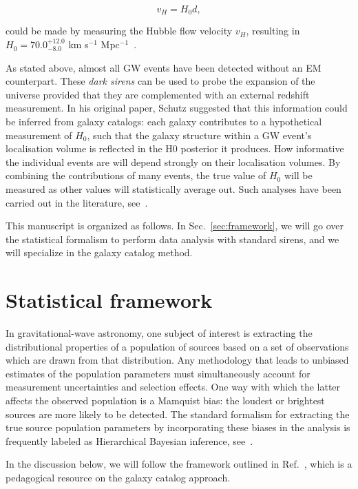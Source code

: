 \documentclass[%
preprint,
 amsmath,amssymb,
 aps,
]{revtex4-2}
\begin{document}
\begin{equation}
	v_H = H_0 d,
\end{equation}

could be made by measuring the Hubble flow velocity $v_H$, resulting in $H_0 = 70.0^{+12.0}_{-8.0}$
km s$^{-1}$ Mpc$^{-1}$~\cite{LIGOScientific:2017adf}.

As stated above, almost all GW events have been detected without an EM counterpart. These
\textit{dark sirens} can be used to probe the expansion of the universe provided that they are
complemented with an external redshift measurement. In his original paper, Schutz suggested that
this information could be inferred from galaxy catalogs: each galaxy contributes to a hypothetical
measurement of $H_0$, such that the galaxy structure within a GW event's localisation volume is
reflected in the H0 posterior it produces. How informative the individual events are will depend
strongly on their localisation volumes. By combining the contributions of many events, the true
value of $H_0$ will be measured as other values will statistically average out. Such analyses have
been carried out in the literature,
see~\cite{DelPozzo:2011vcw,Chen:2017rfc,LIGOScientific:2018gmd,Gray:2019ksv,DES:2019ccw,DES:2020nay}.

This manuscript is organized as follows. In Sec.~\ref{sec:framework}, we will go over the
statistical formalism to perform data analysis with standard sirens, and we will specialize in the
galaxy catalog method.

\section{\label{sec:framework}Statistical framework}

In gravitational-wave astronomy, one subject of interest is extracting the distributional
properties of a population of sources based on a set of observations which are drawn from that
distribution. Any methodology that leads to unbiased estimates of the population parameters must
simultaneously account for measurement uncertainties and selection effects. One way with which the
latter affects the observed population is a Mamquist bias: the loudest or brightest sources are
more likely to be detected. The standard formalism for extracting the true source population
parameters by incorporating these biases in the analysis is frequently labeled as Hierarchical
Bayesian inference, see~\cite{Loredo:2004nn,Mandel:2018mve,Vitale_2021}.

In the discussion below, we will follow the framework outlined in Ref.~,
which is a pedagogical resource on the galaxy catalog approach.
\end{document}
